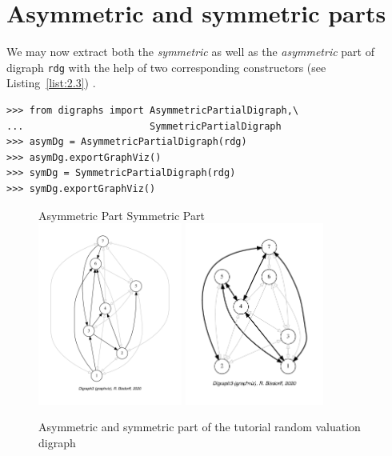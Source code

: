 \section{Asymmetric and symmetric parts}
\label{sec:2.3}

We may now extract both the \emph{}\emph{symmetric} as well as the \emph{asymmetric} part of digraph \texttt{rdg} with the help of two corresponding constructors (see Listing~\vref{list:2.3}) .
\begin{lstlisting}[caption={Computing asymmetric and symmetric Parts},label=list:2.3]
>>> from digraphs import AsymmetricPartialDigraph,\
...                      SymmetricPartialDigraph
>>> asymDg = AsymmetricPartialDigraph(rdg)
>>> asymDg.exportGraphViz()
>>> symDg = SymmetricPartialDigraph(rdg)
>>> symDg.exportGraphViz()
\end{lstlisting}
\begin{figure}[ht]
  Asymmetric Part \hfill Symmetric Part \\
  \includegraphics[height=6cm]{Figures/2-2-asymmetricPart.pdf}\hfill
  \includegraphics[height=6cm]{Figures/2-2-symmetricPart.pdf}\hfill
\caption{Asymmetric and symmetric part of the tutorial random valuation digraph}
\label{fig:2.2}       %
\end{figure}

